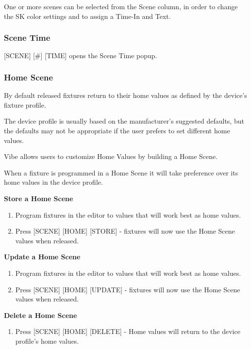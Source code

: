 \documentclass[
]{article}
\providecommand{\tightlist}{%
  \setlength{\itemsep}{0pt}\setlength{\parskip}{0pt}}
\begin{document}
One or more scenes can be selected from the Scene column, in order to change the SK color settings and to assign a Time-In and Text.

\hypertarget{scene-time}{%
\subsubsection{Scene Time}\label{scene-time}}

{[}SCENE{]} {[}\#{]} {[}TIME{]} opens the Scene Time popup.

\hypertarget{home-scene}{%
\subsubsection{Home Scene}\label{home-scene}}

By default released fixtures return to their home values as defined by the device's fixture profile.

The device profile is usually based on the manufacturer's suggested defaults, but the defaults may not be appropriate if the user prefers to set different home values.

Vibe allows users to customize Home Values by building a Home Scene.

When a fixture is programmed in a Home Scene it will take preference over its home values in the device profile.

\textbf{Store a Home Scene}

\begin{enumerate}
\def\labelenumi{\arabic{enumi}.}
\item
  Program fixtures in the editor to values that will work best as home values.
\item
  Press {[}SCENE{]} {[}HOME{]} {[}STORE{]} - fixtures will now use the Home Scene values when released.
\end{enumerate}

\textbf{Update a Home Scene}

\begin{enumerate}
\def\labelenumi{\arabic{enumi}.}
\item
  Program fixtures in the editor to values that will work best as home values.
\item
  Press {[}SCENE{]} {[}HOME{]} {[}UPDATE{]} - fixtures will now use the Home Scene values when released.
\end{enumerate}

\textbf{Delete a Home Scene}

\begin{enumerate}
\def\labelenumi{\arabic{enumi}.}
\tightlist
\item
  Press {[}SCENE{]} {[}HOME{]} {[}DELETE{]} - Home values will return to the device profile's home values.
\end{enumerate}
\end{document}
